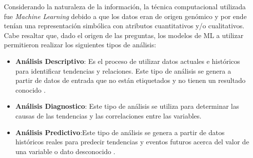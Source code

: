 Considerando la naturaleza de la información, la técnica computacional utilizada fue \textit{Machine Learning} debido a que los datos eran de origen genómico y por ende tenían una representación simbólica con atributos cuantitativos y/o cualitativos. Cabe resaltar que, dado el origen de las preguntas, los modelos de ML a utilizar permitieron realizar los siguientes tipos de análisis:

\begin{itemize}[label=\HandRight]
	\item \textbf{Análisis Descriptivo}:
	Es el proceso de utilizar datos actuales e históricos para identificar tendencias y relaciones. Este tipo de análisis se genera a partir de datos de entrada que no están etiquetados y no tienen un resultado conocido \cite{JorgeCalvo2020}.
	
	\item \textbf{Análisis Diagnostico}:
	Este tipo de análisis se utiliza para determinar las causas de las tendencias y las correlaciones entre las variables\cite{JorgeCalvo2020}.
	
	\item \textbf{Análisis Predictivo}:Este tipo de análisis se genera a partir de datos históricos reales para predecir tendencias y eventos futuros acerca del valor de una variable o dato desconocido \cite{JorgeCalvo2020}.
\end{itemize}

